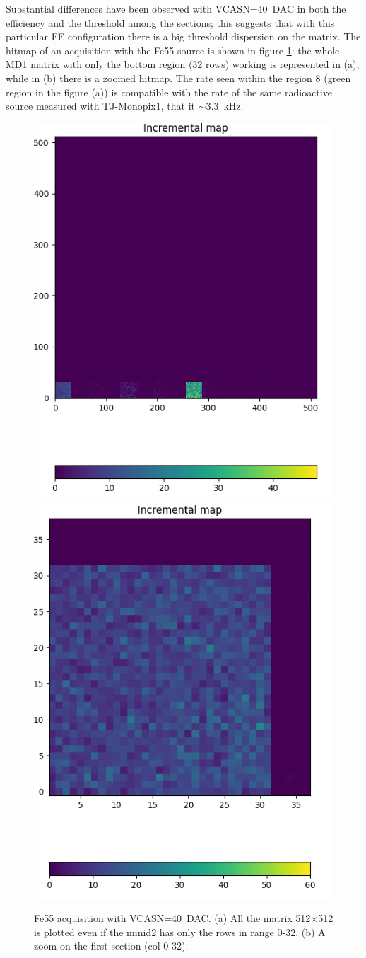     Substantial differences have been observed with VCASN=\SI{40}{DAC} in both the efficiency and the threshold among the sections; this suggests that with this particular FE configuration there is a big threshold dispersion on the matrix.  
    The hitmap of an acquisition with the Fe55 source is shown in figure \ref{fig:ARCADIA_Fe55}: the whole MD1 matrix with only the bottom region (32 rows) working is represented in (a), while in (b) there is a zoomed hitmap. The rate seen within the region 8 (green region in the figure (a)) is compatible with the rate of the same radioactive source measured with TJ-Monopix1, that it $\sim$\SI{3.3}{kHz}. 
    \begin{figure}[h!]
        \centering
        \includegraphics[width=.49\linewidth]{figures/charaterization/ARCADIA/Fe55_5min30s.png}
        \includegraphics[width=.47\linewidth]{figures/charaterization/ARCADIA/Fe55_6min30s.png}
        \caption{Fe55 acquisition with VCASN=\SI{40}{DAC}. (a) All the matrix 512$\times$512 is plotted even if the minid2 has only the rows in range 0-32. (b) A zoom on the first section (col 0-32).   }
        \label{fig:ARCADIA_Fe55}
    \end{figure}  
